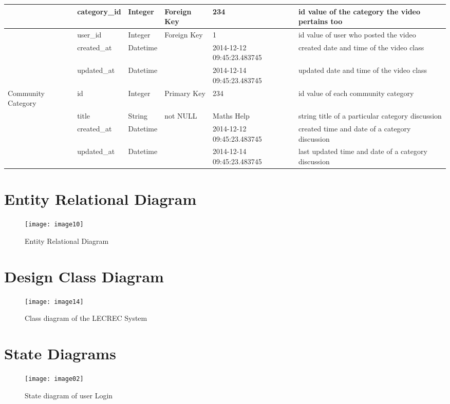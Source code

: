 \documentclass{article}
\begin{document}
\begin{flushleft}
\begin{tabular}{| p{1.6cm} | p{3cm} | l | p{2cm} | p{3cm} | p{4cm} |}
& category\_id & Integer & Foreign Key & 234 & id value of the category the video pertains too \\ \hline
& user\_id & Integer & Foreign Key & 1 & id value of user who posted the video \\ \hline
& created\_at & Datetime & & 2014-12-12 09:45:23.483745 & created date and time of the video class \\ \hline
& updated\_at & Datetime & & 2014-12-14 09:45:23.483745 & updated date and time of the video class \\ \hline
Community Category & id & Integer & Primary Key & 234 & id value of each community category \\ \hline
& title & String & not NULL & Maths Help & string title of a particular category discussion \\ \hline
& created\_at & Datetime & & 2014-12-12 09:45:23.483745 & created time and date of a category discussion  \\ \hline
& updated\_at & Datetime & & 2014-12-14 09:45:23.483745 & last updated time and date of a category discussion \\ \hline
\end{tabular}
\end{flushleft}

\clearpage
\section{Entity Relational Diagram}
\begin{figure}[h!]
\centering
\texttt{[image: image10]}
\caption{Entity Relational Diagram}
\end{figure}

\clearpage
\section{Design Class Diagram}
\begin{figure}[h!]
\centering
\texttt{[image: image14]}
\caption{Class diagram of the LECREC System}
\end{figure}

\clearpage
\section{State Diagrams}
\begin{figure}[h!]
\centering
\texttt{[image: image02]}
\caption{State diagram of user Login}
\end{figure}
\end{document}
